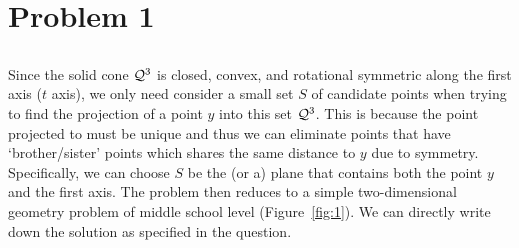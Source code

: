\section{Problem 1}

\subsection{} %

Since the solid cone $\mathcal{Q}^3$ is closed, convex,
and rotational symmetric along the first axis ($t$ axis),
we only need consider a small set $S$ of candidate points
when trying to find the projection of a point $y$ into this set $\mathcal{Q}^3$.
This is because the point projected to must be unique
and thus we can eliminate points that have `brother/sister' points which
shares the same distance to $y$ due to symmetry.
Specifically, we can choose $S$ be the (or a) plane that contains
both the point $y$ and the first axis.
The problem then reduces to a simple two-dimensional geometry problem
of middle school level (Figure~\ref{fig:1}).
We can directly write down the solution as specified in the question.
